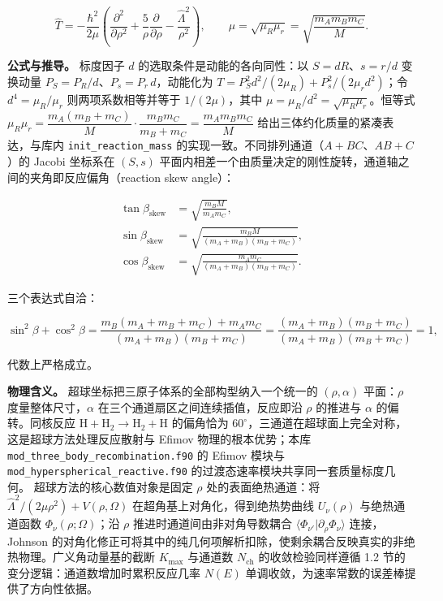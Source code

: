 \documentclass[
]{ctexbook}
\begin{document}
\[\hat{T}=-\frac{\hbar^{2}}{2\mu}\left(\frac{\partial^{2}}{\partial\rho^{2}}+\frac{5}{\rho}\frac{\partial}{\partial\rho}-\frac{\hat{\Lambda}^{2}}{\rho^{2}}\right),
\qquad \mu=\sqrt{\mu_R\mu_r}=\sqrt{\frac{m_A m_B m_C}{M}}.\]

\textbf{公式与推导。} 标度因子 \(d\) 的选取条件是动能的各向同性：以
\(S=dR\)、\(s=r/d\) 变换动量 \(P_S=P_R/d\)、\(P_s=P_r\,d\)，动能化为
\(T=P_S^{2}d^{2}/(2\mu_R)+P_s^{2}/(2\mu_r d^{2})\)；令
\(d^{4}=\mu_R/\mu_r\) 则两项系数相等并等于 \(1/(2\mu)\)，其中
\(\mu=\mu_R/d^{2}=\sqrt{\mu_R\mu_r}\)。恒等式
\(\mu_R\mu_r=\dfrac{m_A(m_B+m_C)}{M}\cdot\dfrac{m_Bm_C}{m_B+m_C}=\dfrac{m_A m_B m_C}{M}\)
给出三体约化质量的紧凑表达，与库内 \texttt{init\_reaction\_mass}
的实现一致。不同排列通道（\(A+BC\)、\(AB+C\)）的 Jacobi 坐标系在
\((S,s)\)
平面内相差一个由质量决定的刚性旋转，通道轴之间的夹角即反应偏角（reaction
skew angle）：

\[
\begin{aligned}
\tan\beta_{\mathrm{skew}}&=\sqrt{\frac{m_B M}{m_A m_C}},\\
\sin\beta_{\mathrm{skew}}&=\sqrt{\frac{m_B M}{(m_A+m_B)(m_B+m_C)}},\\
\cos\beta_{\mathrm{skew}}&=\sqrt{\frac{m_A m_C}{(m_A+m_B)(m_B+m_C)}}.
\end{aligned}
\]

三个表达式自洽：

\[
\sin^{2}\beta+\cos^{2}\beta
=
\frac{m_B(m_A+m_B+m_C)+m_A m_C}{(m_A+m_B)(m_B+m_C)}
=
\frac{(m_A+m_B)(m_B+m_C)}{(m_A+m_B)(m_B+m_C)}
=1,
\]

代数上严格成立。

\textbf{物理含义。} 超球坐标把三原子体系的全部构型纳入一个统一的
\((\rho,\alpha)\) 平面：\(\rho\) 度量整体尺寸，\(\alpha\)
在三个通道扇区之间连续插值，反应即沿 \(\rho\) 的推进与 \(\alpha\)
的偏转。同核反应 \(\mathrm{H}+\mathrm{H}_2\to\mathrm{H}_2+\mathrm{H}\)
的偏角恰为
\(60^{\circ}\)，三通道在超球面上完全对称，这是超球方法处理反应散射与
Efimov 物理的根本优势；本库 \texttt{mod\_three\_body\_recombination.f90}
的 Efimov 模块与 \texttt{mod\_hyperspherical\_reactive.f90}
的过渡态速率模块共享同一套质量标度几何。 超球方法的核心数值对象是固定
\(\rho\) 处的表面绝热通道：将
\(\hat{\Lambda}^{2}/(2\mu\rho^{2})+V(\rho,\Omega)\)
在超角基上对角化，得到绝热势曲线 \(U_{\nu}(\rho)\) 与绝热通道函数
\(\Phi_{\nu}(\rho;\Omega)\)；沿 \(\rho\) 推进时通道间由非对角导数耦合
\(\langle\Phi_{\nu'}|\partial_\rho\Phi_{\nu}\rangle\) 连接，Johnson
的对角化修正可将其中的纯几何项解析扣除，使剩余耦合反映真实的非绝热物理。广义角动量基的截断
\(K_{\max}\) 与通道数 \(N_{\mathrm{ch}}\) 的收敛检验同样遵循 1.2
节的变分逻辑：通道数增加时累积反应几率 \(N(E)\)
单调收敛，为速率常数的误差棒提供了方向性依据。
\end{document}

